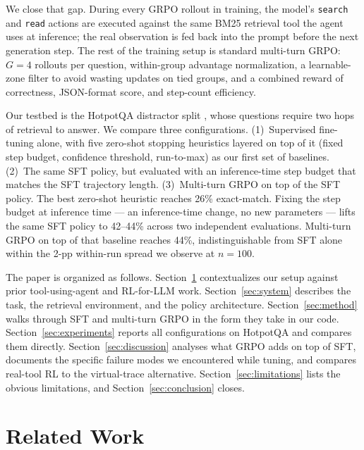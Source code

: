 \documentclass[11pt]{article}
\begin{document}
We close that gap. During every GRPO rollout in training, the model's
\texttt{search} and \texttt{read} actions are executed against the same
BM25 retrieval tool the agent uses at inference; the real observation is
fed back into the prompt before the next generation step. The rest of
the training setup is standard multi-turn GRPO: $G=4$ rollouts per
question, within-group advantage normalization, a learnable-zone filter
to avoid wasting updates on tied groups, and a combined reward of
correctness, JSON-format score, and step-count efficiency.

Our testbed is the HotpotQA distractor split \cite{hotpotqa}, whose
questions require two hops of retrieval to answer. We compare three
configurations. (1)~Supervised fine-tuning alone, with five zero-shot
stopping heuristics layered on top of it (fixed step budget, confidence
threshold, run-to-max) as our first set of baselines. (2)~The same SFT
policy, but evaluated with an inference-time step budget that matches
the SFT trajectory length. (3)~Multi-turn GRPO on top of the SFT policy.
The best zero-shot heuristic reaches 26\% exact-match. Fixing the step
budget at inference time --- an inference-time change, no new
parameters --- lifts the same SFT policy to 42--44\% across two
independent evaluations. Multi-turn GRPO on top of that baseline
reaches 44\%, indistinguishable from SFT alone within the 2-pp
within-run spread we observe at $n{=}100$.

The paper is organized as follows. Section~\ref{sec:related}
contextualizes our setup against prior tool-using-agent and RL-for-LLM
work. Section~\ref{sec:system} describes the task, the retrieval
environment, and the policy architecture. Section~\ref{sec:method}
walks through SFT and multi-turn GRPO in the form they take in our
code. Section~\ref{sec:experiments} reports all configurations on
HotpotQA and compares them directly. Section~\ref{sec:discussion}
analyses what GRPO adds on top of SFT, documents the specific failure
modes we encountered while tuning, and compares real-tool RL to the
virtual-trace alternative. Section~\ref{sec:limitations} lists the
obvious limitations, and Section~\ref{sec:conclusion} closes.

\section{Related Work}
\label{sec:related}
\end{document}
